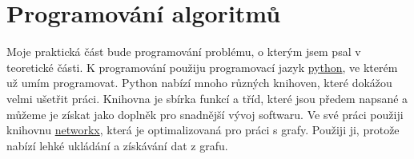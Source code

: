 \chapter{Programování algoritmů}
\label{chap:programovani}

Moje praktická část bude programování problému, o kterým jsem psal v teoretické části. K programování použiju programovací jazyk \href{https://www.python.org/}{python}, ve kterém už umím programovat. Python nabízí mnoho různých knihoven, které dokážou velmi ušetřit práci. Knihovna je sbírka funkcí a tříd, které jsou předem napsané a můžeme je získat jako doplněk pro snadnější vývoj softwaru. Ve své práci použiji knihovnu \href{https://networkx.org/}{networkx}, která je optimalizovaná pro práci s grafy. Použiji ji, protože nabízí lehké ukládání a získávání dat z grafu.


